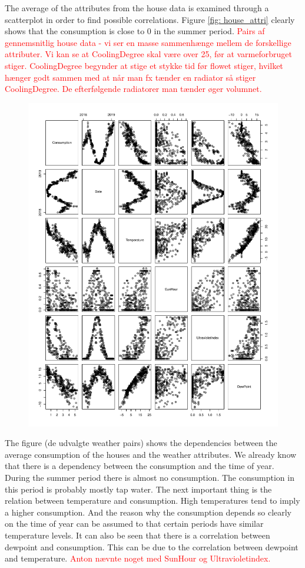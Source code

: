 The average of the attributes from the house data is examined through a scatterplot in order to find possible correlations.
Figure \ref{fig: house_attri} clearly shows that the consumption is close to 0 in the summer period.  
\textcolor{red}{Pairs af gennemsnitlig house data - vi ser en masse sammenhænge mellem de forskellige attributer. Vi kan se at CoolingDegree skal være over 25, før at varmeforbruget stiger.}
\textcolor{red}{CoolingDegree begynder at stige et stykke tid før flowet stiger, hvilket hænger godt sammen med at når man fx tænder en radiator så stiger CoolingDegree. De efterfølgende radiatorer man tænder øger volumnet.} \\

\begin{figure}[H]
    \centering
    \includegraphics[width=.75\textwidth]{../../../figures/weather_cons_focus.pdf}
    \caption{}
    \label{fig: weather_cons_focus}
\end{figure}

The figure (de udvalgte weather pairs) shows the dependencies between the average consumption of the houses and the weather attributes.
We already know that there is a dependency between the consumption and the time of year. During the summer period there
is almost no consumption. The consumption in this period is probably mostly tap water. The next important thing is the relation
between temperature and consumption. High temperatures tend to imply a higher consumption. And the reason why the consumption
depends so clearly on the time of year can be assumed to that certain periods have similar temperature levels. 
It can also be seen that there is a correlation between dewpoint and consumption. This can be due to the correlation between dewpoint and temperature. \textcolor{red}{Anton nævnte noget med SunHour og Ultravioletindex.}

